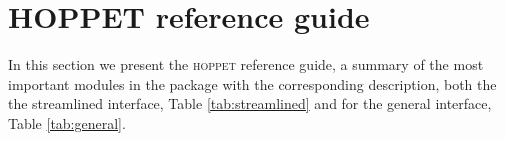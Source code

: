 \documentclass[12pt]{article}
\newcommand{\hoppet}{\textsc{hoppet}\xspace}
\newcommand{\ttt}[1]{\texttt{#1}}
\begin{document}


\section{HOPPET reference guide}
\label{sec:refguide}

In this section we present the \hoppet reference guide, a 
summary of the most important modules in the package with
the corresponding description, both the the streamlined interface,
Table \ref{tab:streamlined} and for the general interface,
Table  \ref{tab:general}.
\end{document}
